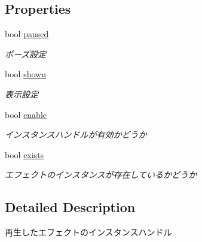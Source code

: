 \subsection*{Properties}
\begin{DoxyCompactItemize}
\item 
bool \hyperlink{struct_effekseer_handle_a3ba9bf72308429369214fd10ebb86ca6}{paused}
\begin{DoxyCompactList}\small\item\em ポーズ設定 \end{DoxyCompactList}\item 
bool \hyperlink{struct_effekseer_handle_a96d0ebfe4cab721aaea0992b1750ae43}{shown}
\begin{DoxyCompactList}\small\item\em 表示設定 \end{DoxyCompactList}\item 
bool \hyperlink{struct_effekseer_handle_a2eabd884f8b23833cbf69f3f9d9c875b}{enable}
\begin{DoxyCompactList}\small\item\em インスタンスハンドルが有効かどうか\par
 \end{DoxyCompactList}\item 
bool \hyperlink{struct_effekseer_handle_ac1d253853e6471ce1e3c951491803c27}{exists}
\begin{DoxyCompactList}\small\item\em エフェクトのインスタンスが存在しているかどうか \end{DoxyCompactList}\end{DoxyCompactItemize}


\subsection{Detailed Description}
再生したエフェクトのインスタンスハンドル 



